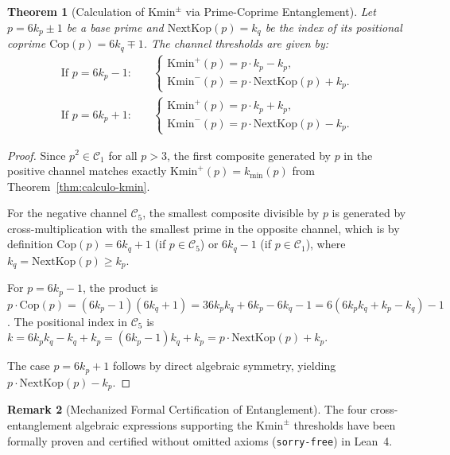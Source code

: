 \documentclass{article}
\numberwithin{equation}{section}
\theoremstyle{plain}
\newtheorem{theorem}{Theorem}[section]
\theoremstyle{definition}
\newtheorem{remark}[theorem]{Remark}
\begin{document}
\begin{theorem}[Calculation of $\mathrm{Kmin}^\pm$ via Prime-Coprime Entanglement]
\label{thm:calculo-kmin-pm}
Let $p = 6k_p \pm 1$ be a base prime and $\mathrm{NextKop}(p) = k_q$ be the index of its positional coprime $\mathrm{Cop}(p) = 6k_q \mp 1$. The channel thresholds are given by:
\begin{align}
\text{If } p = 6k_p - 1: &\quad 
\begin{cases}
\mathrm{Kmin}^+(p) = p \cdot k_p - k_p, \\
\mathrm{Kmin}^-(p) = p \cdot \mathrm{NextKop}(p) + k_p.
\end{cases} \\
\text{If } p = 6k_p + 1: &\quad 
\begin{cases}
\mathrm{Kmin}^+(p) = p \cdot k_p + k_p, \\
\mathrm{Kmin}^-(p) = p \cdot \mathrm{NextKop}(p) - k_p.
\end{cases}
\end{align}
\end{theorem}

\begin{proof}
Since $p^2 \in \mathcal{C}_1$ for all $p > 3$, the first composite generated by $p$ in the positive channel matches exactly $\mathrm{Kmin}^+(p) = k_{\min}(p)$ from Theorem~\ref{thm:calculo-kmin}.

For the negative channel $\mathcal{C}_5$, the smallest composite divisible by $p$ is generated by cross-multiplication with the smallest prime in the opposite channel, which is by definition $\mathrm{Cop}(p) = 6k_q + 1$ (if $p \in \mathcal{C}_5$) or $6k_q - 1$ (if $p \in \mathcal{C}_1$), where $k_q = \mathrm{NextKop}(p) \ge k_p$.

For $p = 6k_p - 1$, the product is $p \cdot \mathrm{Cop}(p) = (6k_p - 1)(6k_q + 1) = 36 k_p k_q + 6k_p - 6k_q - 1 = 6(6 k_p k_q + k_p - k_q) - 1$.
The positional index in $\mathcal{C}_5$ is $k = 6 k_p k_q - k_q + k_p = (6k_p - 1)k_q + k_p = p \cdot \mathrm{NextKop}(p) + k_p$.

The case $p = 6k_p + 1$ follows by direct algebraic symmetry, yielding $p \cdot \mathrm{NextKop}(p) - k_p$.
\end{proof}

\begin{remark}[Mechanized Formal Certification of Entanglement]
\label{rem:certificacion-entrelazamiento}
The four cross-entanglement algebraic expressions supporting the $\mathrm{Kmin}^\pm$ thresholds have been formally proven and certified without omitted axioms (\texttt{sorry-free}) in Lean~4.
\end{remark}
\end{document}
